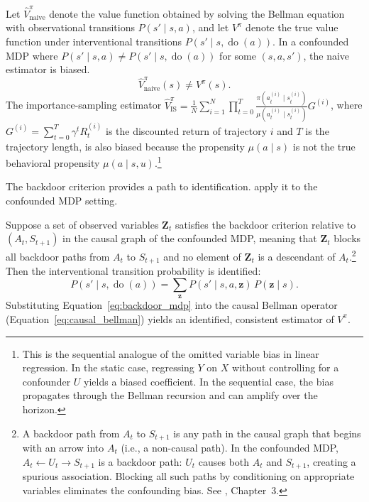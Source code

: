 \begin{lemma}
\label{lem:naive_bias}
Let $\hat{V}^{\pi}_{\text{naive}}$ denote the value function obtained by solving the Bellman equation with observational transitions $P(s' \mid s, a)$, and let $V^\pi$ denote the true value function under interventional transitions $P(s' \mid s, \operatorname{do}(a))$. In a confounded MDP where $P(s' \mid s, a) \neq P(s' \mid s, \operatorname{do}(a))$ for some $(s, a, s')$, the naive estimator is biased.
\begin{equation}
\hat{V}^{\pi}_{\text{naive}}(s) \neq V^\pi(s).
\end{equation}
The importance-sampling estimator $\hat{V}^{\pi}_{\text{IS}} = \frac{1}{N} \sum_{i=1}^N \prod_{t=0}^{T} \frac{\pi(a_t^{(i)} \mid s_t^{(i)})}{\mu(a_t^{(i)} \mid s_t^{(i)})} G^{(i)}$, where $G^{(i)} = \sum_{t=0}^{T} \gamma^t R_t^{(i)}$ is the discounted return of trajectory $i$ and $T$ is the trajectory length, is also biased because the propensity $\mu(a \mid s)$ is not the true behavioral propensity $\mu(a \mid s, u)$.\footnote{This is the sequential analogue of the omitted variable bias in linear regression. In the static case, regressing $Y$ on $X$ without controlling for a confounder $U$ yields a biased coefficient. In the sequential case, the bias propagates through the Bellman recursion and can amplify over the horizon.}
\end{lemma}

The backdoor criterion \citep{pearl2009causality} provides a path to identification. \citet{zhang2020causal} apply it to the confounded MDP setting.

\begin{theorem}
\label{thm:backdoor_mdp}
Suppose a set of observed variables $\mathbf{Z}_t$ satisfies the backdoor criterion relative to $(A_t, S_{t+1})$ in the causal graph of the confounded MDP, meaning that $\mathbf{Z}_t$ blocks all backdoor paths from $A_t$ to $S_{t+1}$ and no element of $\mathbf{Z}_t$ is a descendant of $A_t$.\footnote{A backdoor path from $A_t$ to $S_{t+1}$ is any path in the causal graph that begins with an arrow into $A_t$ (i.e., a non-causal path). In the confounded MDP, $A_t \leftarrow U_t \rightarrow S_{t+1}$ is a backdoor path: $U_t$ causes both $A_t$ and $S_{t+1}$, creating a spurious association. Blocking all such paths by conditioning on appropriate variables eliminates the confounding bias. See \citet{pearl2009causality}, Chapter~3.} Then the interventional transition probability is identified:
\begin{equation}
P(s' \mid s, \operatorname{do}(a)) = \sum_{\mathbf{z}} P(s' \mid s, a, \mathbf{z}) \, P(\mathbf{z} \mid s).
\label{eq:backdoor_mdp}
\end{equation}
Substituting Equation~\eqref{eq:backdoor_mdp} into the causal Bellman operator (Equation~\ref{eq:causal_bellman}) yields an identified, consistent estimator of $V^\pi$.
\end{theorem}

